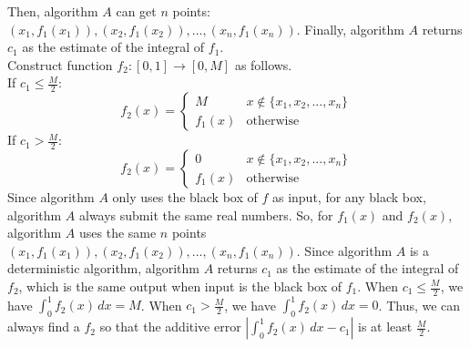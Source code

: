 Then, algorithm $A$ can get $n$ points: $(x_1,f_1(x_1)),(x_2,f_1(x_2)),...,(x_n,f_1(x_n))$.
Finally, algorithm $A$ returns $c_1$ as the estimate of the integral of $f_1$.\\
Construct function $f_2:[0, 1]\rightarrow [0, M ]$ as follows. \\
If $c_1 \le \frac{M}{2}$:
\begin{equation}
   \nonumber  f_2(x)=
    \begin{cases}
    M& x\notin\{x_1,x_2,...,x_n\}\\
    f_1(x)& \text{otherwise}
    \end{cases}
\end{equation}
If $c_1 > \frac{M}{2}$:
\begin{equation}
   \nonumber  f_2(x)=
    \begin{cases}
    0& x\notin\{x_1,x_2,...,x_n\}\\
    f_1(x)& \text{otherwise}
    \end{cases}
\end{equation}
Since algorithm $A$ only uses the black box of $f$ as input, 
for any black box, algorithm $A$ always submit the same real numbers.
So, for $f_1(x)$ and $f_2(x)$, algorithm $A$ uses the same $n$ points $(x_1,f_1(x_1)),(x_2,f_1(x_2)),...,(x_n,f_1(x_n))$.
Since algorithm $A$ is a deterministic algorithm, 
algorithm $A$ returns $c_1$ as the estimate of the integral of $f_2$, which is the same output when input is the black box of $f_1$.
When $c_1 \le \frac{M}{2}$, we have $\int_{0}^{1} f_2(x) \,dx=M$.
When $c_1 > \frac{M}{2}$, we have $\int_{0}^{1} f_2(x) \,dx=0$.
Thus, we can always find a $f_2$ so that the additive error $|\int_{0}^{1} f_2(x) \,dx - c_1|$ is at least $\frac{M}{2}$.
\\
\noindent {}\\
